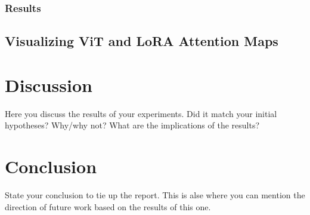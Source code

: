 \documentclass[10pt]{article}
\begin{document}
\subsubsection{Results}


\subsection{Visualizing ViT and LoRA Attention Maps}


\section{Discussion}
Here you discuss the results of your experiments. Did it match your initial hypotheses? Why/why not? What are the implications of the results?

\section{Conclusion}
State your conclusion to tie up the report. This is alse where you can mention the direction of future work based on the results of this one.



\end{document}
